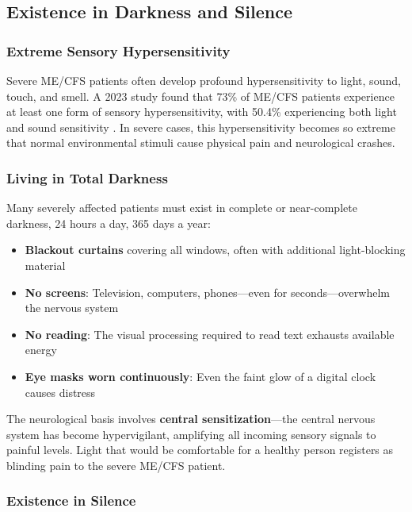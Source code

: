 \subsection{Existence in Darkness and Silence}
\label{sec:sensory-prison}

\subsubsection{Extreme Sensory Hypersensitivity}
\label{subsec:hypersensitivity}

Severe ME/CFS patients often develop profound hypersensitivity to light, sound, touch, and smell. A 2023 study found that 73\% of ME/CFS patients experience at least one form of sensory hypersensitivity, with 50.4\% experiencing both light and sound sensitivity \cite{Maeda2023sensory}. In severe cases, this hypersensitivity becomes so extreme that normal environmental stimuli cause physical pain and neurological crashes.

\subsubsection{Living in Total Darkness}

Many severely affected patients must exist in complete or near-complete darkness, 24 hours a day, 365 days a year:

\begin{itemize}
    \item \textbf{Blackout curtains} covering all windows, often with additional light-blocking material
    \item \textbf{No screens}: Television, computers, phones---even for seconds---overwhelm the nervous system
    \item \textbf{No reading}: The visual processing required to read text exhausts available energy
    \item \textbf{Eye masks worn continuously}: Even the faint glow of a digital clock causes distress
\end{itemize}

The neurological basis involves \textbf{central sensitization}---the central nervous system has become hypervigilant, amplifying all incoming sensory signals to painful levels. Light that would be comfortable for a healthy person registers as blinding pain to the severe ME/CFS patient.

\subsubsection{Existence in Silence}

